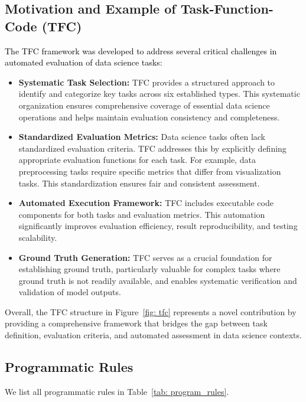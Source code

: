 \subsection{Motivation and Example of Task-Function-Code (TFC)}
\textcolor{black}{
The TFC framework was developed to address several critical challenges in automated evaluation of data science tasks:}
\begin{itemize}[leftmargin=*,itemsep=0pt,parsep=0.5em,topsep=0.3em,partopsep=0.3em]
    \item \textbf{Systematic Task Selection:} TFC provides a structured approach to identify and categorize key tasks across six established types. This systematic organization ensures comprehensive coverage of essential data science operations and helps maintain evaluation consistency and completeness.
    \item \textbf{Standardized Evaluation Metrics:} Data science tasks often lack standardized evaluation criteria. TFC addresses this by explicitly defining appropriate evaluation functions for each task. For example, data preprocessing tasks require specific metrics that differ from visualization tasks. This standardization ensures fair and consistent assessment.
    \item \textbf{Automated Execution Framework:} TFC includes executable code components for both tasks and evaluation metrics. This automation significantly improves evaluation efficiency, result reproducibility, and testing scalability.
    \item \textbf{Ground Truth Generation:} TFC serves as a crucial foundation for establishing ground truth, particularly valuable for complex tasks where ground truth is not readily available, and enables systematic verification and validation of model outputs.
\end{itemize}
Overall, the TFC structure in Figure~\ref{fig: tfc} represents a novel contribution by providing a comprehensive framework that bridges the gap between task definition, evaluation criteria, and automated assessment in data science contexts.


\subsection{Programmatic Rules}
We list all programmatic rules in Table~\ref{tab: program_rules}.



